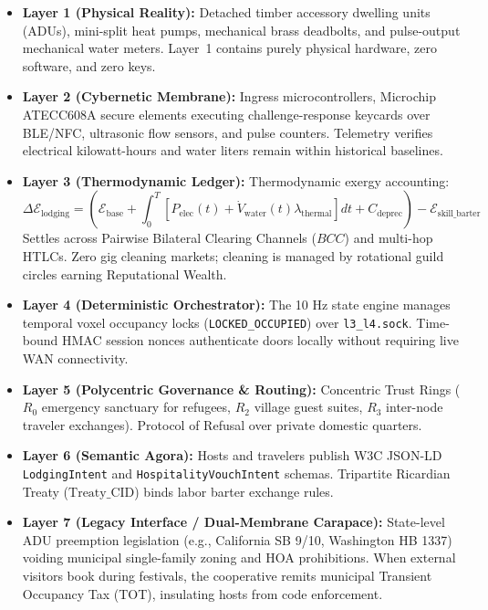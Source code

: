 \begin{itemize}
    \item \textbf{Layer 1 (Physical Reality):} Detached timber accessory dwelling units (ADUs), mini-split heat pumps, mechanical brass deadbolts, and pulse-output mechanical water meters. Layer~1 contains purely physical hardware, zero software, and zero keys.
    \item \textbf{Layer 2 (Cybernetic Membrane):} Ingress microcontrollers, Microchip ATECC608A secure elements executing challenge-response keycards over BLE/NFC, ultrasonic flow sensors, and pulse counters. Telemetry verifies electrical kilowatt-hours and water liters remain within historical baselines.
    \item \textbf{Layer 3 (Thermodynamic Ledger):} Thermodynamic exergy accounting:
    \[
    \Delta \mathcal{E}_{\mathrm{lodging}} = \left( \mathcal{E}_{\mathrm{base}} + \int_{0}^{T} \left[ P_{\mathrm{elec}}(t) + \dot{V}_{\mathrm{water}}(t) \lambda_{\mathrm{thermal}} \right] dt + C_{\mathrm{deprec}} \right) - \mathcal{E}_{\mathrm{skill\_barter}}
    \]
    Settles across Pairwise Bilateral Clearing Channels ($BCC$) and multi-hop HTLCs. Zero gig cleaning markets; cleaning is managed by rotational guild circles earning Reputational Wealth.
    \item \textbf{Layer 4 (Deterministic Orchestrator):} The 10 Hz state engine manages temporal voxel occupancy locks (\texttt{LOCKED\_OCCUPIED}) over \texttt{l3\_l4.sock}. Time-bound HMAC session nonces authenticate doors locally without requiring live WAN connectivity.
    \item \textbf{Layer 5 (Polycentric Governance \& Routing):} Concentric Trust Rings ($R_0$ emergency sanctuary for refugees, $R_2$ village guest suites, $R_3$ inter-node traveler exchanges). Protocol of Refusal over private domestic quarters.
    \item \textbf{Layer 6 (Semantic Agora):} Hosts and travelers publish W3C JSON-LD \texttt{LodgingIntent} and \texttt{HospitalityVouchIntent} schemas. Tripartite Ricardian Treaty ($\mathrm{Treaty\_CID}$) binds labor barter exchange rules.
    \item \textbf{Layer 7 (Legacy Interface / Dual-Membrane Carapace):} State-level ADU preemption legislation (e.g., California SB 9/10, Washington HB 1337) voiding municipal single-family zoning and HOA prohibitions. When external visitors book during festivals, the cooperative remits municipal Transient Occupancy Tax (TOT), insulating hosts from code enforcement.
\end{itemize}

